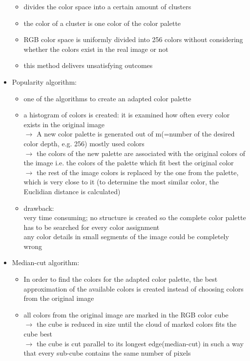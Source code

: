 \documentclass[12pt]{article}
\begin{document}
\begin{itemize}
\begin{itemize}
		\item divides the color space into a certain amount of clusters
		\item the color of a cluster is one color of the color palette
		\item RGB color space is uniformly divided into 256 colors without considering whether the colors exist in the real image or not
		\item this method delivers unsatisfying outcomes
	\end{itemize}
	\item Popularity algorithm:
	\begin{itemize}
		\item one of the algorithms to create an adapted color palette
		\item a histogram of colors is created: it is examined how often every color exists in the original image \\
		$\rightarrow$ A new color palette is generated out of m(=number of the desired color depth, e.g. 256) mostly used colors \\
		$\rightarrow$ the colors of the new palette are associated with the original colors of the image i.e. the colors of the palette which fit best the original color \\
		$\rightarrow$ the rest of the image colors is replaced by the one from the palette, which is very close to it (to determine the most similar color, the Euclidian distance is calculated)
		\item drawback:\\
		very time consuming; no structure is created so the complete color palette has to be searched for every color assignment \\
		any color details in small segments of the image could be completely wrong
	\end{itemize}
	\item Median-cut algorithm:
	\begin{itemize}
		\item In order to find the colors for the adapted color palette, the best approximation of the available colors is created instead of choosing colors from the original image
		\item all colors from the original image are marked in the RGB color cube \\
		$\rightarrow$ the cube is reduced in size until the cloud of marked colors fits the cube best \\
		$\rightarrow$ the cube is cut parallel to its longest edge(median-cut) in such a way that every sub-cube contains the same number of pixels \\

\end{itemize}
\end{itemize}
\end{document}
